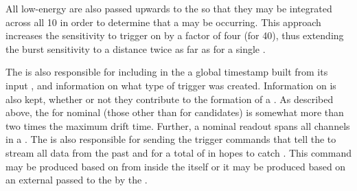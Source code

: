 All low-energy  are also passed upwards to the
 so that they may be integrated across all \SI{10}{\kton}
 in order to determine that a  may be
occurring. 
This approach increases the sensitivity to trigger on  by
a factor of four (for \SI{40}{\kton}), thus extending the burst
sensitivity to a distance twice as far as for a single \nominalmodsize
{}. 

	
The  is also responsible for including in the
 a global timestamp built from its input
, and information on what type of trigger was
created. 
Information on  is also kept, whether or not
they contribute to the formation of a . 
As described above, the  for nominal
 (those other than for  candidates)
is somewhat more than two times the maximum drift time. 
Further, a nominal readout spans all channels in a . 
The  is also responsible for sending the trigger commands
that tell the  to stream all data from the past
\snbpretime and for a total of \snbtime in hopes to catch
.
This command may be produced based on  from
inside the  itself or it may be produced based on an external
  passed to the  by the
.

